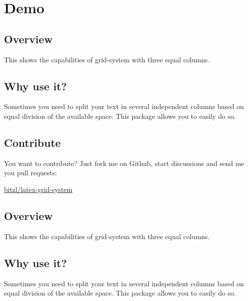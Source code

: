 \documentclass[DIV12]{scrartcl}
\begin{document}
\section{Demo}
\blindtext

\begin{row}{3}
	\begin{cell}{1}
	\section*{Overview}
	\vspace{-1.5ex}
	This shows the capabilities of grid-system with three equal columns.
	\end{cell}
	\begin{cell}{1}
	\section*{Why use it?}
	\vspace{-1.5ex}
	Sometimes you need to split your text in several independent columns based on equal division of the available space. This package allows you to easily do so.
	\end{cell}
	\begin{cell}{1}
	\section*{Contribute}
	\vspace{-1.5ex}
	You want to contribute? Just fork me on Github, start discussions and send me you pull requests: %
	\begin{center}
	\href{https://github.com/bitzl/latex-grid-system}{bitzl/latex-grid-system}
	\end{center}
	\end{cell}
\end{row}

\begin{row}{3}
	\begin{cell}{1}
	\section*{Overview}
	\vspace{-1.5ex}
	This shows the capabilities of grid-system with three equal columns.
	\end{cell}
	\begin{cell}{2}
	\section*{Why use it?}
	\vspace{-1.5ex}
	Sometimes you need to split your text in several independent columns based on equal division of the available space. This package allows you to easily do so.
	\end{cell}
\end{row}
\end{document}

